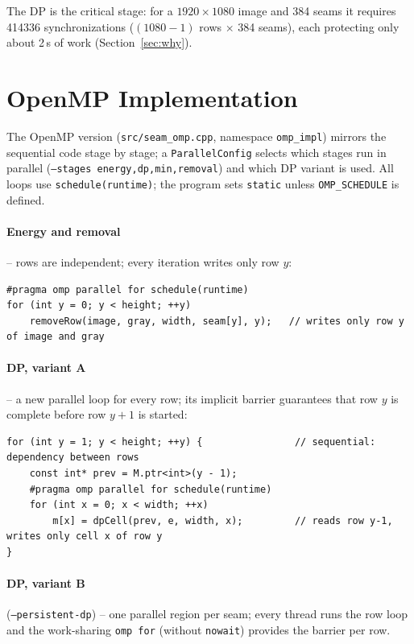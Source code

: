 \documentclass[11pt,a4paper]{article}
\newcommand{\us}{\,\textmu s}
\begin{document}
The DP is the critical stage: for a $1920\times1080$ image and 384 seams it requires \num{414336}
synchronizations ($(1080-1)$ rows $\times$ 384 seams), each protecting only about 2\us{} of work
(Section~\ref{sec:why}).

\section{OpenMP Implementation}
\label{sec:omp}

The OpenMP version (\texttt{src/seam\_omp.cpp}, namespace \texttt{omp\_impl}) mirrors the sequential code
stage by stage; a \texttt{ParallelConfig} selects which stages run in parallel
(\texttt{--stages energy,dp,min,removal}) and which DP variant is used. All loops use
\texttt{schedule(runtime)}; the program sets \texttt{static} unless \texttt{OMP\_SCHEDULE} is defined.

\paragraph{Energy and removal} -- rows are independent; every iteration writes only row $y$:
\begin{lstlisting}[style=cpp]
#pragma omp parallel for schedule(runtime)
for (int y = 0; y < height; ++y)
    removeRow(image, gray, width, seam[y], y);   // writes only row y of image and gray
\end{lstlisting}

\paragraph{DP, variant A} -- a new parallel loop for every row; its implicit barrier guarantees that row
$y$ is complete before row $y+1$ is started:
\begin{lstlisting}[style=cpp]
for (int y = 1; y < height; ++y) {                // sequential: dependency between rows
    const int* prev = M.ptr<int>(y - 1);
    #pragma omp parallel for schedule(runtime)
    for (int x = 0; x < width; ++x)
        m[x] = dpCell(prev, e, width, x);         // reads row y-1, writes only cell x of row y
}
\end{lstlisting}

\paragraph{DP, variant B} (\texttt{--persistent-dp}) -- one parallel region per seam; every thread runs
the row loop and the work-sharing \texttt{omp for} (without \texttt{nowait}) provides the barrier per row.
\end{document}
